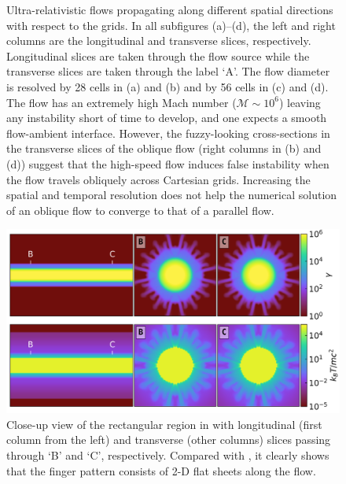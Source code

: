 \begin{figure}
{      \label{fig:DiagonalFlowHig} %
    }
  \caption{
Ultra-relativistic flows propagating along different spatial directions with respect to the grids. In all subfigures (a)--(d), the left and right columns are the longitudinal and transverse slices, respectively. Longitudinal slices are taken through the flow source while the transverse slices are taken through the label `A'. The flow diameter is resolved by 28 cells in (a) and (b) and by 56 cells in (c) and (d). The flow has an extremely high Mach number ($\mathscr{M}\sim 10^{6}$) leaving any instability short of time to develop, and one expects a smooth flow-ambient interface. However, the fuzzy-looking cross-sections in the transverse slices of the oblique flow (right columns in (b) and (d)) suggest that the high-speed flow induces false instability when the flow travels obliquely across Cartesian grids. Increasing the spatial and temporal resolution does not help the numerical solution of an oblique flow to converge to that of a parallel flow.}
  \label{fig:GridEffect}
\end{figure}






\begin{figure}
\includegraphics[width=\columnwidth]{figures/fig__HorizontalFlowHigZoomIn.png}
\centering
\caption{Close-up view of the rectangular region in  with longitudinal (first column from the left) and transverse (other columns) slices passing through `B' and `C', respectively. Compared with , it clearly shows that the finger pattern consists of 2-D flat sheets along the flow.}
\label{fig:HorizontalFlowHigZoomIn}
\end{figure}


